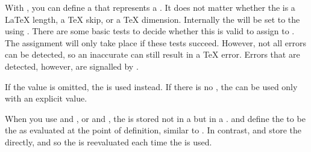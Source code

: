 \begin{Declaration}
\end{Declaration}
With , you can
define a  that represents a . It does not matter
whether the  is a \LaTeX{} length, a \TeX{} skip, or a \TeX{}
dimension. Internally the  will be set to the 
using . There are some basic tests to decide whether
this  is valid to assign to . The assignment will
only take place if these tests succeed. However, not all errors can be
detected, so an inaccurate  can still result in a \TeX{} error.
Errors that are detected, however, are signalled by
.

If the value is omitted, the
 is used instead. If there is no , the
 can be used only with an explicit value.

When you use  and ,
or  and , the
 is stored not in a  but in a
.  and
 define the  to be the
 as evaluated at the point of definition, similar to 
. In contrast,
 and
 store the  directly, and
so the  is reevaluated each time the  is used.%
\EndIndexGroup



